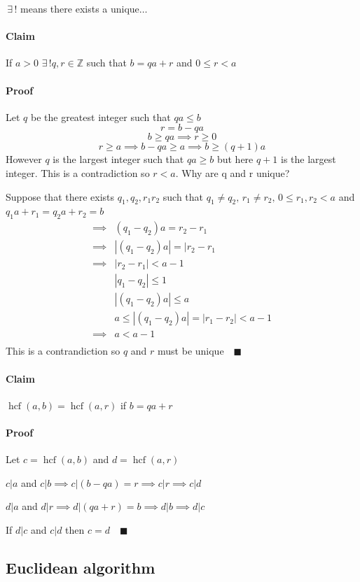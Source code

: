 \documentclass{article}
\newcommand{\bb}[1]{\mathbb{#1}}
\newcommand{\E}{\,\exists\,}
\newcommand{\hcf}{\operatorname{hcf}}
\begin{document}
\(\E!\) means there exists a unique\(\dotso\)

\paragraph{Claim} If \(a>0\,\E! q,r\in\bb Z\) such that \(b=qa+r\) and \(0\le r<a\)

\paragraph{Proof} Let \(q\) be the greatest integer such that \(qa\le b\)
\[r=b-qa\]
\[b\ge qa\implies r\ge 0\]
\[r\ge a\implies b-qa\ge a\implies b\ge(q+1)a\]
However \(q\) is the largest integer such that \(qa\ge b\) but here \(q+1\) is the largest integer. This is a contradiction so \(r<a\).
Why are q and r unique?

Suppose that there exists \(q_1,q_2,r_1r_2\) such that \(q_1\ne q_2,\,r_1\ne r_2,\,0\le r_1,r_2< a\) and \(q_1a+r_1 = q_2 a + r_2=b\)
\begin{align*}
\implies &(q_1-q_2)a = r_2-r_1\\
\implies &|(q_1-q_2)a| = |r_2-r_1\\
\implies &|r_2-r_1|<a-1\\
&|q_1-q_2|\le 1\\
&|(q_1-q_2)a|\le a\\
&a\le|(q_1-q_2)a|=|r_1-r_2|<a-1\\
\implies &a<a-1\\
\end{align*}
This is a contrandiction so \(q\) and \(r\) must be unique\(\quad\blacksquare\)


\paragraph{Claim} \(\hcf(a,b)=\hcf(a,r)\) if \(b=qa+r\)

\paragraph{Proof} Let \(c = \hcf(a,b)\) and \(d = \hcf(a,r)\)

\(c|a\) and \(c|b\implies c|(b-qa) = r\implies c|r\implies c|d\)

\(d|a\) and \(d|r\implies d|(qa+r) = b\implies d|b\implies d|c\) 

If \(d|c\) and \(c|d\) then \(c = d\quad\blacksquare\)

\subsection*{Euclidean algorithm}
\end{document}
